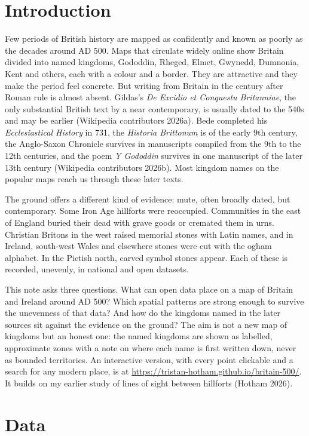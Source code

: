 \documentclass[11pt,a4paper]{article}
\begin{document}
\section{Introduction}

Few periods of British history are mapped as confidently and known as poorly as the decades around AD 500. Maps that circulate widely online show Britain divided into named kingdoms, Gododdin, Rheged, Elmet, Gwynedd, Dumnonia, Kent and others, each with a colour and a border. They are attractive and they make the period feel concrete. But writing from Britain in the century after Roman rule is almost absent. Gildas's \textit{De Excidio et Conquestu Britanniae}, the only substantial British text by a near contemporary, is usually dated to the 540s and may be earlier (Wikipedia contributors 2026a). Bede completed his \textit{Ecclesiastical History} in 731, the \textit{Historia Brittonum} is of the early 9th century, the Anglo-Saxon Chronicle survives in manuscripts compiled from the 9th to the 12th centuries, and the poem \textit{Y Gododdin} survives in one manuscript of the later 13th century (Wikipedia contributors 2026b). Most kingdom names on the popular maps reach us through these later texts.

The ground offers a different kind of evidence: mute, often broadly dated, but contemporary. Some Iron Age hillforts were reoccupied. Communities in the east of England buried their dead with grave goods or cremated them in urns. Christian Britons in the west raised memorial stones with Latin names, and in Ireland, south-west Wales and elsewhere stones were cut with the ogham alphabet. In the Pictish north, carved symbol stones appear. Each of these is recorded, unevenly, in national and open datasets.

This note asks three questions. What can open data place on a map of Britain and Ireland around AD 500? Which spatial patterns are strong enough to survive the unevenness of that data? And how do the kingdoms named in the later sources sit against the evidence on the ground? The aim is not a new map of kingdoms but an honest one: the named kingdoms are shown as labelled, approximate zones with a note on where each name is first written down, never as bounded territories. An interactive version, with every point clickable and a search for any modern place, is at \url{https://tristan-hotham.github.io/britain-500/}. It builds on my earlier study of lines of sight between hillforts (Hotham 2026).

\section{Data}
\end{document}
